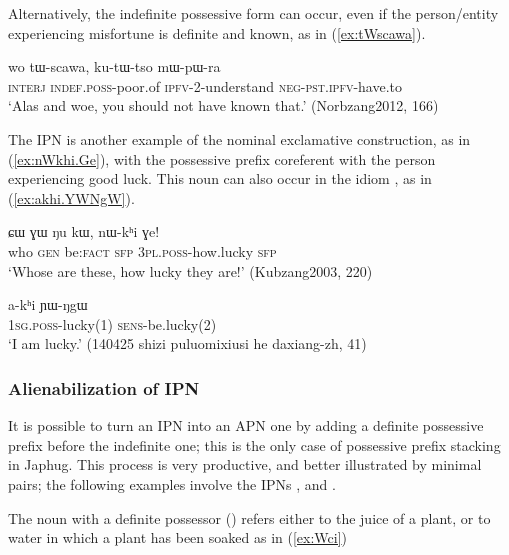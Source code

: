 Alternatively, the indefinite possessive form  can occur, even if the person/entity experiencing misfortune is definite and known, as in (\ref{ex:tWscawa}).

\begin{exe}
\ex \label{ex:tWscawa}
\gll wo tɯ-scawa, ku-tɯ-tso mɯ-pɯ-ra \\
\textsc{interj} \textsc{indef}.\textsc{poss}-poor.of \textsc{ipfv}-2-understand \textsc{neg}-\textsc{pst}.\textsc{ipfv}-have.to \\
\glt `Alas and woe, you should not have known that.' (Norbzang2012, 166)
\end{exe}

The IPN  is another example of the nominal exclamative construction, as in (\ref{ex:nWkhi.Ge}), with the possessive prefix coreferent with the person experiencing good luck. This noun can also occur in the idiom , as in (\ref{ex:akhi.YWNgW}).

\begin{exe}
\ex \label{ex:nWkhi.Ge}
\gll ɕɯ ɣɯ ŋu kɯ, nɯ-kʰi ɣe! \\
who \textsc{gen} be:\textsc{fact} \textsc{sfp} \textsc{3pl}.\textsc{poss}-how.lucky \textsc{sfp} \\
\glt `Whose are these, how lucky they are!' (Kubzang2003, 220)
\end{exe}

\begin{exe}
\ex \label{ex:akhi.YWNgW}
\gll a-kʰi ɲɯ-ŋgɯ \\
\textsc{1sg}.\textsc{poss}-lucky(1) \textsc{sens}-be.lucky(2) \\
\glt `I am lucky.' (140425 shizi puluomixiusi he daxiang-zh, 41)
\end{exe}

\subsubsection{Alienabilization of IPN} \label{sec:alienabilization}
 It is possible to turn an IPN  into an APN one by adding a definite possessive prefix before the indefinite one; this is the only case of possessive prefix stacking in Japhug. This process is very productive, and better illustrated by minimal pairs; the following examples involve the IPNs ,  and .
 
The noun  with a definite possessor () refers either to the juice of a plant, or to water in which a plant has been soaked as in (\ref{ex:Wci})

